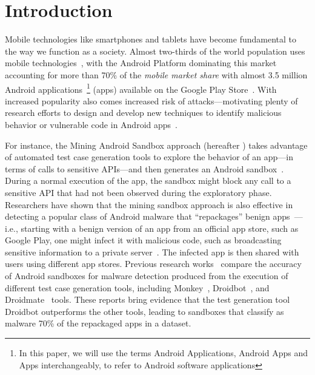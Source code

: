 \section{Introduction}\label{sec:introduction}

Mobile technologies like smartphones and tablets have become fundamental to the way we function as a society. Almost two-thirds of the world population
uses mobile technologies~\cite{Comscore,DBLP:journals/tse/MartinSJZH17}, with the
Android Platform dominating this market accounting for more than 70\% of the \emph{mobile
market share} with almost 3.5 million Android applications~\footnote{In this paper, we will use the terms Android Applications, Android Apps and Apps interchangeably, to refer to Android software applications} (apps)
available on the Google Play Store~\cite{Statista}. 
With increased popularity also comes increased risk of attacks---motivating plenty of research efforts to design and develop new techniques
to identify malicious behavior or vulnerable code in Android apps~\cite{10.1145/3017427}.


For instance, the
Mining Android Sandbox approach (hereafter \mas) takes advantage of automated test case generation tools 
to explore the behavior of an app---in terms of calls to sensitive APIs---and then
generates an Android sandbox~\cite{DBLP:conf/icse/JamrozikSZ16}. During a normal
execution of the app, the sandbox might block any call to a sensitive API
that had not been observed during the exploratory phase. 
Researchers have shown that the mining sandbox approach is also effective
in detecting a popular class of Android malware that ``repackages'' benign apps~\cite{DBLP:conf/wcre/BaoLL18,le2018towards}---i.e., starting with a benign version of an app from an official app store, such as Google Play, one might infect it with
malicious code, such as broadcasting
sensitive information to a private server~\cite{DBLP:journals/tse/LiBK21}. The infected app is then
shared with users using different app stores. 
Previous research works~\cite{DBLP:conf/wcre/BaoLL18,DBLP:journals/jss/CostaMMSSBNR22} compare the accuracy of Android sandboxes for malware detection 
produced from the execution of different test case generation tools, including Monkey~\cite{Monkey}, Droidbot~\cite{DBLP:conf/icse/LiYGC17}, and Droidmate~\cite{DBLP:conf/kbse/BorgesHZ18} tools.
These reports bring evidence that the test generation tool Droidbot outperforms the other tools, leading to sandboxes that
classify as malware 70\% of the repackaged apps in a dataset.

